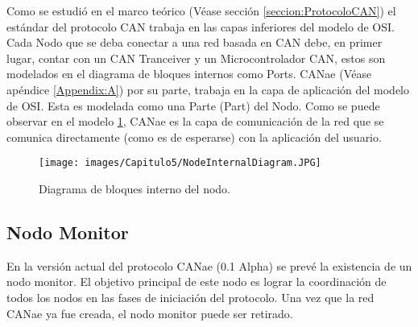 Como se estudió en el marco teórico (Véase sección \ref{seccion:ProtocoloCAN})
el estándar del protocolo CAN \citep{can-ciaWEB} trabaja en las capas
inferiores del modelo de OSI. Cada Nodo que se deba conectar a una red basada
en CAN debe, en primer lugar, contar con un CAN Tranceiver y un
Microcontrolador CAN, estos son modelados en el diagrama de bloques
internos como Ports. CANae (Véase apéndice \ref{Appendix:A}) por su parte,
trabaja en la capa de aplicación del modelo de OSI. Esta es modelada como
una Parte (Part) del Nodo. Como se puede observar en el modelo
\ref{fig:BloquesInternosArq}, CANae es la capa de comunicación de la red
que se comunica directamente (como es de esperarse) con la aplicación
del usuario. 

\begin{figure}[h!]
 \centering
 \texttt{[image: images/Capitulo5/NodeInternalDiagram.JPG]}
 \caption{Diagrama de bloques interno del nodo.}
\label{fig:BloquesInternosArq}
\end{figure}

\subsection{Nodo Monitor}
En la versión actual del protocolo CANae (0.1 Alpha) se prevé la existencia de un
nodo monitor. El objetivo principal de este nodo es lograr la coordinación 
de todos los nodos en las fases de iniciación del protocolo. Una vez que la red
CANae ya fue creada, el nodo monitor  puede ser retirado.
